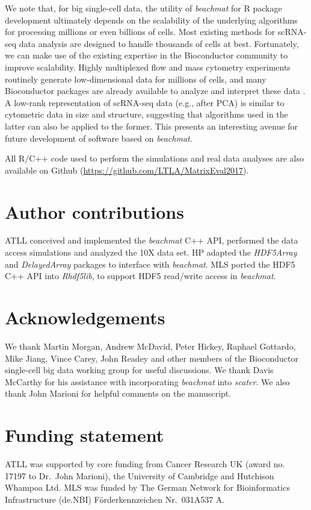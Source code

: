 \documentclass[10pt,letterpaper]{article}
\newcommand{\beachmat}{\textit{beachmat}}
\begin{document}
We note that, for big single-cell data, the utility of \beachmat{} for R package development ultimately depends on the scalability of the underlying algorithms for processing millions or even billions of cells.
Most existing methods for scRNA-seq data analysis are designed to handle thousands of cells at best.
Fortunately, we can make use of the existing expertise in the Bioconductor community to improve scalability.
Highly multiplexed flow and mass cytometry experiments routinely generate low-dimensional data for millions of cells,
and many Bioconductor packages are already available to analyze and interpret these data \cite{finak2014opencyto,weber2016comparison,lun2017testing}.
A low-rank representation of scRNA-seq data (e.g., after PCA) is similar to cytometric data in size and structure, suggesting that algorithms used in the latter can also be applied to the former.
This presents an interesting avenue for future development of software based on \beachmat{}.

All R/C++ code used to perform the simulations and real data analyses are also available on Github (\url{https://github.com/LTLA/MatrixEval2017}).

\section*{Author contributions}
ATLL conceived and implemented the \beachmat{} C++ API, performed the data access simulations and analyzed the 10X data set.
HP adapted the \textit{HDF5Array} and \textit{DelayedArray} packages to interface with \beachmat{}.
MLS ported the HDF5 C++ API into \textit{Rhdf5lib}, to support HDF5 read/write access in \beachmat{}.

\section*{Acknowledgements}
We thank Martin Morgan, Andrew McDavid, Peter Hickey, Raphael Gottardo, Mike Jiang, Vince Carey, John Readey and other members of the Bioconductor single-cell big data working group for useful discussions.
We thank Davis McCarthy for his assistance with incorporating \beachmat{} into \textit{scater}.
We also thank John Marioni for helpful comments on the manuscript.

\section*{Funding statement}
ATLL was supported by core funding from Cancer Research UK (award no. 17197 to Dr.\ John Marioni), the University of Cambridge and Hutchison Whampoa Ltd.
MLS was funded by The German Network for Bioinformatics Infrastructure (de.NBI) F\"orderkennzeichen Nr.\ 031A537 A.


\end{document}
